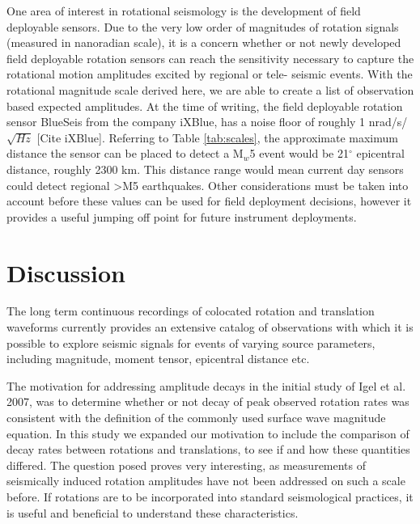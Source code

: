 \documentclass{gji}
\begin{document}
One area of interest in rotational seismology is the development of field deployable sensors. Due to the very low order of magnitudes of rotation signals (measured in nanoradian scale), it is a concern whether or not newly developed field deployable rotation sensors can reach the sensitivity necessary to capture the rotational motion amplitudes excited by regional or tele- seismic events. With the rotational magnitude scale derived here, we are able to create a list of observation based expected amplitudes. At the time of writing, the field deployable rotation sensor BlueSeis from the company iXBlue, has a noise floor of roughly 1 nrad/s/$\sqrt{Hz}$ [Cite iXBlue]. Referring to Table \ref{tab:scales}, the approximate maximum distance the sensor can be placed to detect a M$_w$5 event would be 21$^\circ$ epicentral distance, roughly 2300 km. This distance range would mean current day sensors could detect regional >M5 earthquakes. Other considerations must be taken into account before these values can be used for field deployment decisions, however it provides a useful jumping off point for future instrument deployments.



\section{Discussion}
The long term continuous recordings of colocated rotation and translation waveforms currently provides an extensive catalog of observations with which it is possible to explore seismic signals for events of varying source parameters, including magnitude, moment tensor, epicentral distance etc. 

The motivation for addressing amplitude decays in the initial study of Igel et al. 2007, was to determine whether or not decay of peak observed rotation rates was consistent with the definition of the commonly used surface wave magnitude equation. In this study we expanded our motivation to include the comparison of decay rates between rotations and translations, to see if and how these quantities differed. The question posed proves very interesting, as measurements of seismically induced rotation amplitudes have not been addressed on such a scale before. If rotations are to be incorporated into standard seismological practices, it is useful and beneficial to understand these characteristics.
\end{document}
